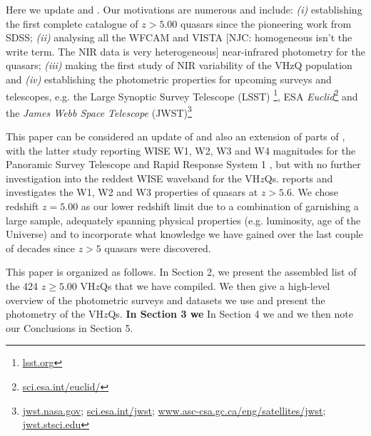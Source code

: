 \documentclass[usenatbib]{mnras}
\begin{document}
Here we update \citet{Jiang2010} and \citet{Blain2013} \citep[along
with Table 8 of][]{Banados2016}. Our motivations are numerous and
include: {\it (i)} establishing the first complete catalogue of
$z>5.00$ quasars since the pioneering work from SDSS; {\it (ii)}
analysing all the WFCAM and VISTA [NJC: homogeneous isn't the write term. The NIR data is very heterogeneous] near-infrared photometry for the quasars; {\it
(iii)} making the first study of NIR variability of the VHzQ
population and {\it (iv)} establishing the photometric properties for
upcoming surveys and telescopes, e.g. the Large Synoptic Survey
Telescope (LSST) \footnote{\href{https://www.lsst.org}{{lsst.org}}},
ESA {\it
Euclid}\footnote{\href{https://sci.esa.int/euclid/}{sci.esa.int/euclid/}}
and the {\it James Webb Space Telescope}
(JWST)\footnote{\href{https://www.jwst.nasa.gov/}{jwst.nasa.gov};
\href{https://sci.esa.int/jwst/}{sci.esa.int/jwst};
\href{https://www.asc-csa.gc.ca/eng/satellites/jwst/}{www.asc-csa.gc.ca/eng/satellites/jwst};
\href{https://jwst.stsci.edu/}{jwst.stsci.edu}}

This paper can be considered an update of \citet{Blain2013} and also
an extension of parts of \citet{Banados2016}, with the latter study
reporting WISE W1, W2, W3 and W4 magnitudes for the Panoramic Survey
Telescope and Rapid Response System 1 \citep[Pan-STARRS1,
PS1;][]{Kaiser2002, Kaiser2010}, but with no further investigation
into the reddest WISE waveband for the VH$z$Qs.  \citet{Banados2016}
reports and investigates the W1, W2 and W3 properties of quasars at $z
> 5.6$. We chose redshift $z=5.00$ as our lower redshift limit due to
a combination of garnishing a large sample, adequately spanning
physical properties (e.g. luminosity, age of the Universe) and to
incorporate what knowledge we have gained over the last couple of
decades since $z>5$ quasars were discovered.

This paper is organized as follows.  In Section 2, we present the
assembled list of the 424 $z\geq5.00$ VH$z$Qs that we have
compiled. We then give a high-level overview of the photometric
surveys and datasets we use and present the photometry of the VH$z$Qs.
\textbf{In Section 3 we } In Section 4 we and we then note our Conclusions in
Section 5.
\end{document}

